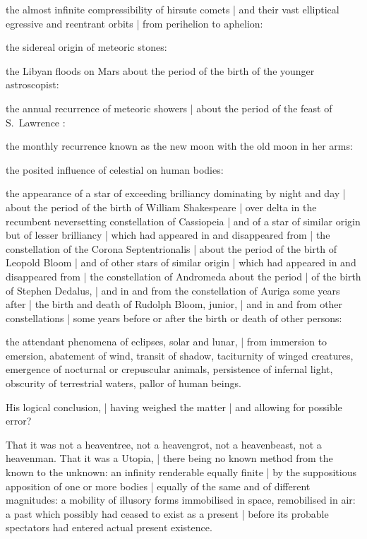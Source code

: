 \Household
the almost infinite compressibility of hirsute comets |
and their vast elliptical egressive and reentrant orbits |
from perihelion to aphelion:

\Factual
the sidereal origin of meteoric stones:

\Philosophy
the Libyan floods on Mars
about the period of the birth of the younger astroscopist:

\Memories
the annual recurrence of meteoric showers |
about the period of the feast of S.~Lawrence
:

\Household
the monthly recurrence known as the new moon with the old moon in her arms:

\Religious
the posited influence of celestial on human bodies:

\Science
the appearance of a star
of exceeding brilliancy dominating by night and day |
about the period of the birth of William Shakespeare |
over delta in the recumbent neversetting constellation of Cassiopeia |
and of a star
of similar origin but of lesser brilliancy |
which had appeared in and disappeared from |
the constellation of the Corona Septentrionalis |
about the period of the birth of Leopold Bloom |
and of other stars of
similar origin |
which had
appeared in and disappeared from |
the constellation of Andromeda about the period |
of the birth of Stephen Dedalus, |
and in and from the constellation of Auriga some years after |
the birth and death of Rudolph Bloom, junior, |
and in and from other constellations |
some years before or after the birth or death of other persons:

\Poetry
the attendant phenomena of eclipses, solar and lunar, |
from immersion to emersion,
abatement of wind, transit of shadow,
taciturnity of winged creatures,
emergence of nocturnal or crepuscular animals,
persistence of infernal light,
obscurity of terrestrial waters,
pallor of human beings.


His
logical conclusion, |
having weighed the matter |
and allowing for possible error?

\Poetry
That it was not a heaventree, not a heavengrot, not a heavenbeast, not a heavenman.
That it was a Utopia, |
there being no known method from the known to the unknown:
an infinity renderable equally finite |
by the suppositious apposition of one or more bodies |
equally of the same and of different magnitudes:
a mobility of illusory forms immobilised in space,
remobilised in air:
a past which possibly had ceased to exist as a present |
before its probable spectators had entered actual present existence.


